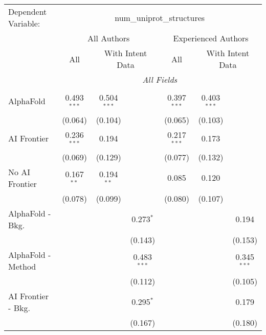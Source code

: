 \begingroup
\centering
\begin{tabular}{lcccccc}
   \tabularnewline \midrule \midrule
   Dependent Variable: & \multicolumn{6}{c}{num\_uniprot\_structures}\\
 & \multicolumn{3}{c}{All Authors} & \multicolumn{3}{c}{Experienced Authors} \\
\cmidrule(lr){2-4} \cmidrule(lr){5-7}
 & \multicolumn{1}{c}{All} & \multicolumn{2}{c}{With Intent Data} & \multicolumn{1}{c}{All} & \multicolumn{2}{c}{With Intent Data} \\
\cmidrule(lr){2-2} \cmidrule(lr){3-4} \cmidrule(lr){5-5} \cmidrule(lr){6-7}
 & \multicolumn{6}{c}{\textit{All Fields}} \\ \\
   AlphaFold               & 0.493$^{***}$ & 0.504$^{***}$ &               & 0.397$^{***}$ & 0.403$^{***}$ &   \\   
                           & (0.064)       & (0.104)       &               & (0.065)       & (0.103)       &   \\   
   AI Frontier             & 0.236$^{***}$ & 0.194         &               & 0.217$^{***}$ & 0.173         &   \\   
                           & (0.069)       & (0.129)       &               & (0.077)       & (0.132)       &   \\   
   No AI Frontier          & 0.167$^{**}$  & 0.194$^{**}$  &               & 0.085         & 0.120         &   \\   
                           & (0.078)       & (0.099)       &               & (0.080)       & (0.107)       &   \\   
   AlphaFold - Bkg.        &               &               & 0.273$^{*}$   &               &               & 0.194\\   
                           &               &               & (0.143)       &               &               & (0.153)\\   
   AlphaFold - Method      &               &               & 0.483$^{***}$ &               &               & 0.345$^{***}$\\   
                           &               &               & (0.112)       &               &               & (0.105)\\   
   AI Frontier - Bkg.      &               &               & 0.295$^{*}$   &               &               & 0.179\\   
                           &               &               & (0.167)       &               &               & (0.180)\\   

\end{tabular}

